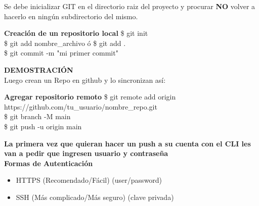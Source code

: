 \documentclass{beamer}
\begin{document}
	\begin{frame}
	Se debe inicializar GIT en el directorio raiz del proyecto y procurar \textbf{NO} volver a hacerlo en ningún subdirectorio del mismo. 
		\begin{block}{\textbf{Creación de un repositorio local}}
			\$ git init\\
			\vspace{0.3cm}
			\$ git add nombre\_archivo ó \$ git add .\\
			\vspace{0.3cm}
			\$ git commit -m "mi primer commit" \\
			\vspace{0.3cm}
		\end{block}	
	\end{frame}

	\begin{frame}
	\textbf{DEMOSTRACIÓN}\\ Luego crean un Repo en github y lo sincronizan así:
		\begin{block}{\textbf{Agregar repositorio remoto}}
			\small \$ git remote add origin https://github.com/tu\_usuario/nombre\_repo.git\\
			\vspace{0.3cm}
			\small \$ git branch -M main\\
			\vspace{0.3cm}
			\small \$ git push -u origin main \\
			\vspace{0.3cm}
		\end{block}	
	\end{frame}


	\begin{frame}
		\textbf{La primera vez que quieran hacer un push a su cuenta con el CLI les van a pedir que ingresen usuario y contraseña} \\
		\vspace{1cm}
		\textbf{Formas de Autenticación}
		\begin{itemize}
			\item HTTPS (Recomendado/Fácil) (user/password)
			\item SSH (Más complicado/Más seguro) (clave privada)
		\end{itemize}
	\end{frame}
\end{document}

